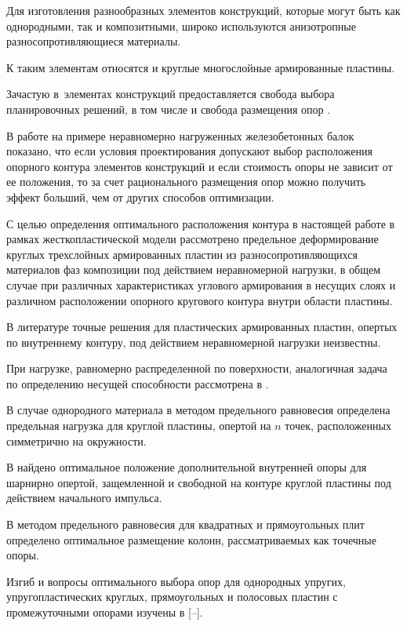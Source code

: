 \makerutitle





 Для изготовления разнообразных элементов конструкций, которые могут быть как однородными, так и композитными, широко используются анизотропные разносопротивляющиеся материалы.

К таким элементам относятся и круглые многослойные армированные пластины.

Зачастую в~элементах конструкций предоставляется свобода выбора планировочных решений, в том числе и свобода размещения опор \cite{rom:bib1}.

В работе \cite{rom:bib2} на примере неравномерно нагруженных железобетонных балок показано, что если условия проектирования допускают выбор расположения опорного контура элементов конструкций и если стоимость опоры не зависит от ее положения, то за счет рационального размещения опор можно получить эффект больший, чем от других способов оптимизации.

С целью определения оптимального расположения контура в настоящей работе в рамках жесткопластической модели рассмотрено предельное деформирование круглых трехслойных армированных пластин из разносопротивляющихся материалов фаз композиции под действием неравномерной нагрузки, в общем случае при различных характеристиках углового армирования в несущих слоях и различном расположении опорного кругового контура внутри области пластины.

В литературе точные решения для пластических армированных пластин, опертых по внутреннему контуру, под действием неравномерной нагрузки неизвестны.

При нагрузке, равномерно распределенной по поверхности, аналогичная задача по определению несущей способности рассмотрена в \cite{rom:bib3}.

В случае однородного материала в \cite{rom:bib4} методом предельного равновесия определена предельная нагрузка для круглой пластины, опертой на $n$ точек, расположенных симметрично на окружности.

В \cite{rom:bib5} найдено оптимальное положение дополнительной внутренней опоры для шарнирно опертой, защемленной и свободной на контуре круглой пластины под действием начального импульса.

В \cite{rom:bib6, rom:bib7} методом предельного равновесия для квадратных и прямоугольных плит определено оптимальное размещение колонн, рассматриваемых как точечные опоры.

Изгиб и вопросы оптимального выбора опор для однородных упругих, упругопластических круглых, прямоугольных и полосовых пластин с промежуточными опорами изучены в [--].

